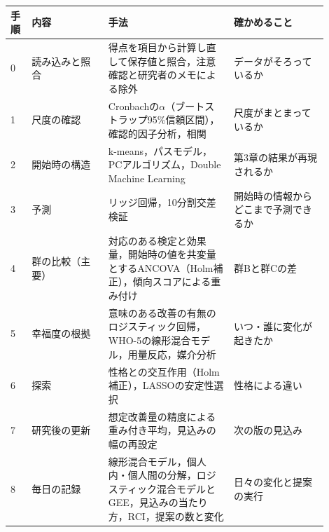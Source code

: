 \begin{table}[h]
\centering
{}
\label{tab:analysis2}
\small
\begin{tabular}{@{}p{0.05\linewidth}p{0.22\linewidth}p{0.36\linewidth}p{0.27\linewidth}@{}}
\toprule
手順 & 内容 & 手法 & 確かめること \\
\midrule
0 & 読み込みと照合 & 得点を項目から計算し直して保存値と照合，注意確認と研究者のメモによる除外 & データがそろっているか \\
1 & 尺度の確認 & Cronbachの$\alpha$（ブートストラップ95\%信頼区間），確認的因子分析，相関 & 尺度がまとまっているか \\
2 & 開始時の構造 & k-means，パスモデル，PCアルゴリズム，Double Machine Learning & 第3章の結果が再現されるか \\
3 & 予測 & リッジ回帰，10分割交差検証 & 開始時の情報からどこまで予測できるか \\
4 & 群の比較（主要） & 対応のある検定と効果量，開始時の値を共変量とするANCOVA（Holm補正），傾向スコアによる重み付け & 群Bと群Cの差 \\
5 & 幸福度の根拠 & 意味のある改善の有無のロジスティック回帰，WHO-5の線形混合モデル，用量反応，媒介分析 & いつ・誰に変化が起きたか \\
6 & 探索 & 性格との交互作用（Holm補正），LASSOの安定性選択 & 性格による違い \\
7 & 研究後の更新 & 想定改善量の精度による重み付き平均，見込みの幅の再設定 & 次の版の見込み \\
8 & 毎日の記録 & 線形混合モデル，個人内・個人間の分解，ロジスティック混合モデルとGEE，見込みの当たり方，RCI，提案の数と変化 & 日々の変化と提案の実行 \\
\bottomrule
\end{tabular}
\end{table}

